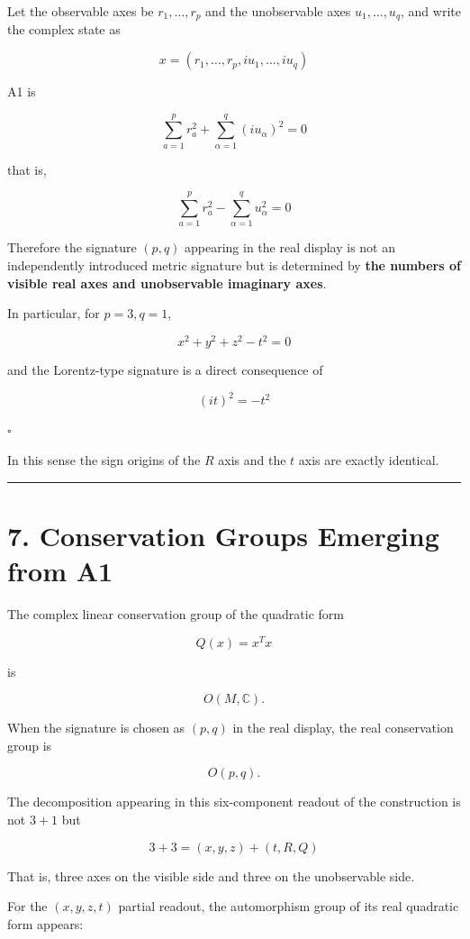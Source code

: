 \documentclass[
  a4paper,
]{article}
\begin{document}
Let the observable axes be \(r_1,\ldots,r_p\) and the unobservable axes
\(u_1,\ldots,u_q\), and write the complex state as

\[
x=(r_1,\ldots,r_p,iu_1,\ldots,iu_q)
\]

A1 is

\[
\sum_{a=1}^{p}r_a^2+\sum_{\alpha=1}^{q}(iu_\alpha)^2=0
\]

that is,

\[
\boxed{
\sum_{a=1}^{p}r_a^2-\sum_{\alpha=1}^{q}u_\alpha^2=0
}
\]

Therefore the signature \((p,q)\) appearing in the real display is not
an independently introduced metric signature but is determined by
\textbf{the numbers of visible real axes and unobservable imaginary
axes}.

In particular, for \(p=3,q=1\),

\[
\boxed{
x^2+y^2+z^2-t^2=0
}
\]

and the Lorentz-type signature is a direct consequence of

\[
\boxed{(it)^2=-t^2}
\]

\(\square\)

In this sense the sign origins of the \(R\) axis and the \(t\) axis are
exactly identical.

\begin{center}\rule{0.5\linewidth}{0.5pt}\end{center}

\section{7. Conservation Groups Emerging from
A1}\label{conservation-groups-emerging-from-a1}

The complex linear conservation group of the quadratic form

\[
Q(x)=x^Tx
\]

is

\[
\boxed{
O(M,\mathbb C)
}.
\]

When the signature is chosen as \((p,q)\) in the real display, the real
conservation group is

\[
\boxed{
O(p,q)
}.
\]

The decomposition appearing in this six-component readout of the
construction is not \(3+1\) but

\[
\boxed{
3+3=(x,y,z)+(t,R,Q)
}
\]

That is, three axes on the visible side and three on the unobservable
side.

For the \((x,y,z,t)\) partial readout, the automorphism group of its
real quadratic form appears:
\end{document}
